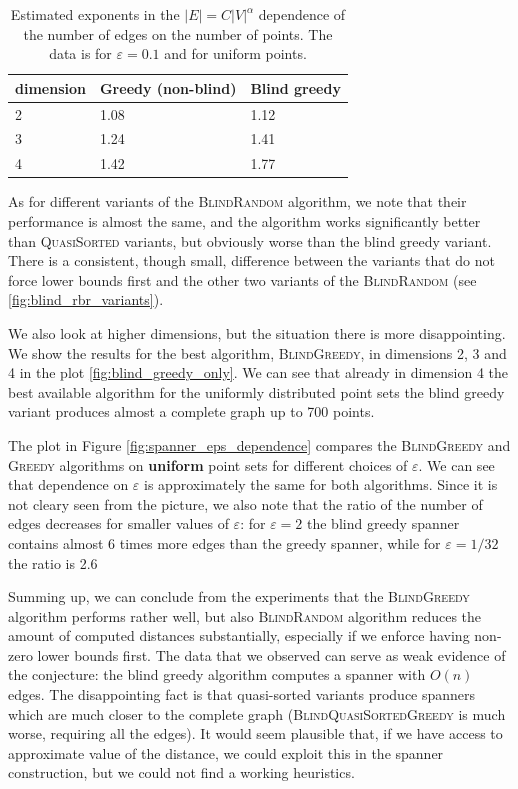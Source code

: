 \documentclass[a4paper,USenglish]{socg-lipics-v2018}
\newcommand{\eps}{\varepsilon}
\begin{document}
\begin{table}[]
\begin{tabular}{|l|l|l|}
\hline
dimension & \textbf{Greedy (non-blind)} & \textbf{Blind greedy} \\ \hline
2         &         1.08                &  1.12                 \\ \hline
3         &         1.24                &  1.41                \\ \hline
4         &         1.42                &  1.77                 \\ \hline
\end{tabular}
\caption{Estimated exponents in the $|E|= C |V|^\alpha$ dependence of the number of edges
on the number of points. The data is for $\eps = 0.1$ and for uniform points.}
\label{tbl:regr_coeff_spanner}
\end{table}


As for different variants of the \textsc{BlindRandom} algorithm,
we note that their performance is almost the same, and the algorithm works
significantly better than \textsc{QuasiSorted} variants, but obviously
worse than the blind greedy variant. There is a consistent, though small,
difference between the variants that do not force lower bounds first and
the other two variants of the \textsc{BlindRandom} (see \ref{fig:blind_rbr_variants}).


We also look at higher dimensions, but the situation there is more
disappointing. We show the results for the best algorithm, \textsc{BlindGreedy},
in dimensions 2, 3 and 4 in the plot \ref{fig:blind_greedy_only}.
We can see that already in dimension 4 the best available algorithm
for the uniformly distributed point sets the blind greedy variant
produces almost a complete graph up to 700 points.  


The plot in Figure \ref{fig:spanner_eps_dependence}
compares the \textsc{BlindGreedy} and \textsc{Greedy} algorithms
on \textbf{uniform} point sets for different choices of $\eps$. We can see that dependence on $\eps$
is approximately the same for both algorithms. Since it is not cleary seen from the picture, we also note 
that the ratio of the number of edges decreases for
smaller values of $\eps$: 
for $\eps = 2$ the blind greedy spanner contains almost 6 times more edges than the greedy spanner,
while for $\eps = 1/32$ the ratio is 2.6

Summing up, we can conclude from the experiments that 
 the \textsc{BlindGreedy} algorithm performs rather well, but also \textsc{BlindRandom}
algorithm reduces the amount of computed distances substantially, especially if we enforce having non-zero lower bounds
first. The data that we observed can serve as weak evidence
of the conjecture: the blind greedy algorithm computes
a spanner with $O(n)$ edges. The disappointing fact is that quasi-sorted variants produce spanners which are much closer to the complete graph
(\textsc{BlindQuasiSortedGreedy} is much worse, requiring all the edges). It would seem plausible that, if we have
access to approximate value of the distance, we could exploit this in the spanner construction, but we could not
find a working heuristics.
\end{document}
